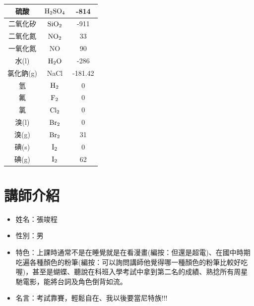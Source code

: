 \begin{longtable}{|c|c|c|}
硫酸            & $\rm H_2SO_4$        & -814                    \\ \hline
二氧化矽          & $\rm SiO_2$         & -911                    \\ \hline
二氧化氮          & $\rm NO_2$          & 33                      \\ \hline
一氧化氮          & NO           & 90                      \\ \hline
水(l)          & $\rm H_2O$          & -286                    \\ \hline
氯化鈉(g)        & NaCl         & -181.42                 \\ \hline
氫             & $\rm H_2$           & 0                       \\ \hline
氟             & $\rm F_2$           & 0                       \\ \hline
氯             & $\rm Cl_2$          & 0                       \\ \hline
溴(l)          & $\rm Br_2$          & 0                       \\ \hline
溴(g)          & $\rm Br_2$          & 31                      \\ \hline
碘(s)          & $\rm I_2$           & 0                       \\ \hline
碘(g)          & $\rm I_2$           & 62                      \\ \hline
\end{longtable}


\section{講師介紹}
\begin{itemize}
\item 姓名：張竣程
\item 性別：男
\item 特色：上課時通常不是在睡覺就是在看漫畫(編按：但還是超電)、在國中時期吃遍各種顏色的粉筆(編按：可以詢問講師他覺得哪一種顏色的粉筆比較好吃喔)，甚至是蝴蝶、聽說在科班入學考試中拿到第二名的成績、熟捻所有周星馳電影，能將台詞及角色倒背如流。
\item 名言：考試靠賽，輕鬆自在、我以後要當尼特族!!!
\end{itemize}